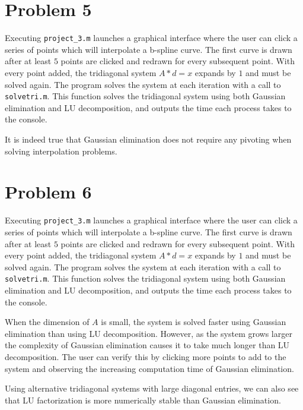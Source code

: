 \documentclass[paper=a4, fontsize=11pt]{scrartcl} %
\begin{document}
\section*{Problem 5}
\setcounter{section}{5}
\setcounter{subsection}{1}

Executing \texttt{project\_3.m} launches a graphical interface where the user
can click a series of points which will interpolate a b-spline curve. The first
curve is drawn after at least $5$ points are clicked and redrawn for every
subsequent point. With every point added, the tridiagonal system $A*d = x$
expands by $1$ and must be solved again. The program solves the system at
each iteration with a call to \texttt{solvetri.m}. This function solves 
the tridiagonal system using both Gaussian elimination and LU decomposition,
and outputs the time each process takes to the console.

\bigskip
It is indeed true that Gaussian elimination does not require any pivoting 
when solving interpolation problems.

\section*{Problem 6}
\setcounter{section}{6}
\setcounter{subsection}{1}

Executing \texttt{project\_3.m} launches a graphical interface where the user
can click a series of points which will interpolate a b-spline curve. The first
curve is drawn after at least $5$ points are clicked and redrawn for every
subsequent point. With every point added, the tridiagonal system $A*d = x$
expands by $1$ and must be solved again. The program solves the system at
each iteration with a call to \texttt{solvetri.m}. This function solves 
the tridiagonal system using both Gaussian elimination and LU decomposition,
and outputs the time each process takes to the console.

\bigskip
When the dimension of $A$ is small, the system is solved faster using Gaussian
elimination than using LU decomposition. However, as the system grows larger
the complexity of Gaussian elimination causes it to take much longer than LU
decomposition. The user can verify this by clicking more points to add to the
system and observing the increasing computation time of Gaussian elimination.

\bigskip
Using alternative tridiagonal systems with large diagonal entries, we can also
see that LU factorization is more numerically stable than Gaussian elimination.
\end{document}
